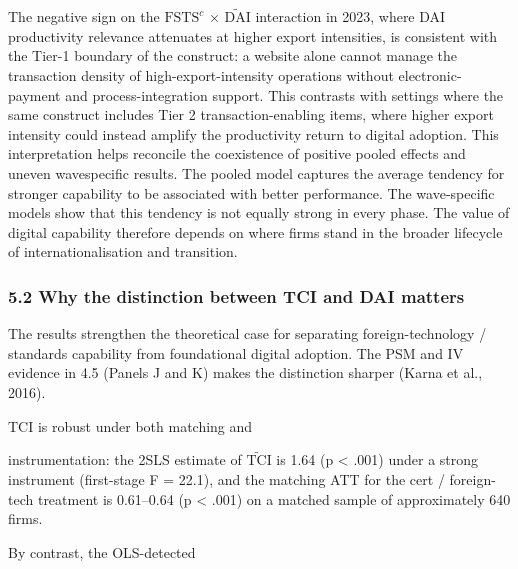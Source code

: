 \documentclass[12pt,a4paper]{article}
\begin{document}
The negative sign on the \(\mathrm{FSTS}^{c}\) ×
\(\tilde{\mathrm{DAI}}\) interaction in 2023, where DAI productivity
relevance attenuates at higher export intensities, is consistent with
the Tier-1 boundary of the construct: a website alone cannot manage the
transaction density of high-export-intensity operations without
electronic-payment and process-integration support. This contrasts with
settings where the same construct includes Tier 2 transaction-enabling
items, where higher export intensity could instead amplify the
productivity return to digital adoption. This interpretation helps
reconcile the coexistence of positive pooled effects and uneven
wavespecific results. The pooled model captures the average tendency for
stronger capability to be associated with better performance. The
wave-specific models show that this tendency is not equally strong in
every phase. The value of digital capability therefore depends on where
firms stand in the broader lifecycle of internationalisation and
transition.

\hypertarget{52-why-the-distinction-between-tci-and-dai-matters}{%
\subsubsection{5.2 Why the distinction between TCI and DAI
matters}\label{52-why-the-distinction-between-tci-and-dai-matters}}

The results strengthen the theoretical case for separating
foreign-technology / standards capability from foundational digital
adoption. The PSM and IV evidence in 4.5 (Panels J and K) makes the
distinction sharper (Karna et al., 2016).

TCI is robust under both matching and

instrumentation: the 2SLS estimate of \(\tilde{\mathrm{TCI}}\) is 1.64
(p \textless{} .001) under a strong instrument (first-stage F = 22.1),
and the matching ATT for the cert / foreign-tech treatment is 0.61--0.64
(p \textless{} .001) on a matched sample of approximately 640 firms.

By contrast, the OLS-detected
\end{document}
